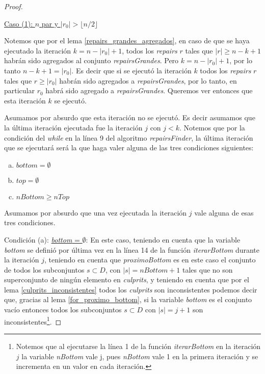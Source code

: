 \documentclass[11pt,a4paper,twoside]{tesis}
\newcommand{\parteEntera}{\lfloor n/2 \rfloor}
\begin{document}
\begin{proof}
\begin{center}
\underline{Caso (1): $n$ par y $|r_0| > \parteEntera$}
\end{center}
 
Notemos que por el lema \ref{repairs_grandes_agregados}, en caso de que se haya ejecutado la iteración $k = n - |r_0| + 1$, todos los \textit{repairs} $r$ tales que $|r| \geq n - k + 1$ habrán sido agregados al conjunto \textit{repairsGrandes}. Pero $k = n - |r_0| + 1$, por lo tanto $n - k + 1 = |r_0|$. Es decir que si se ejecutó la iteración $k$ todos los \textit{repairs} $r$ tales que $r \geq |r_0|$ habrán sido agregados a \textit{repairsGrandes}, por lo tanto, en particular $r_0$ habrá sido agregado a \textit{repairsGrandes}. Queremos ver entonces que esta iteración $k$ se ejecutó.

Asumamos por absurdo que esta iteración no se ejecutó. Es decir asumamos que la última iteración ejecutada fue la iteración $j$ con $j < k$. Notemos que por la condición del \textit{while} en la línea 9 del algoritmo \textit{repairsFinder}, la última iteración que se ejecutará será la que haga valer alguna de las tres condiciones siguientes:

\begin{enumerate}[(a)]
    \item $bottom = \emptyset$
    \item $top = \emptyset$
    \item $nBottom \geq nTop$
\end{enumerate}

Asumamos por absurdo que una vez ejecutada la iteración $j$ vale alguna de esas tres condiciones.

Condición (a): \underline{\textit{bottom} = $\emptyset$}: En este caso, teniendo en cuenta que la variable \textit{bottom}  se definió por última vez en la línea 14 de la función \textit{iterarBottom} durante la iteración $j$, teniendo en cuenta que \textit{proximoBottom} es en este caso el conjunto de todos los subconjuntos $s \subset D$, con $|s| = nBottom + 1$ tales que no son superconjunto de ningún elemento en \textit{culprits}, y teniendo en cuenta que por el lema \ref{culprits_inconsistentes} todos los \textit{culprits} son inconsistentes podemos decir que, gracias al lema \ref{for_proximo_bottom}, si la variable \textit{bottom} es el conjunto vacío entonces todos los subconjuntos $s \subset D$ con $|s| = j + 1$ son inconsistentes\footnote{Notemos que al ejecutarse la línea 1 de la función \textit{iterarBottom} en la iteración $j$ la variable \textit{nBottom} vale j, pues \textit{nBottom} vale 1 en la primera iteración y se incrementa en un valor en cada iteración.}.


\end{proof}
\end{document}
